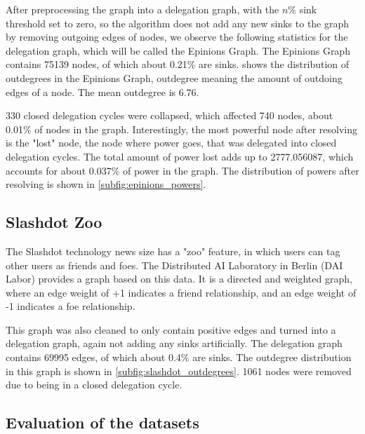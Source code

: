 After preprocessing the graph into a delegation graph, with the $n\%$ sink threshold set to zero, so the algorithm does not add any new sinks to the graph by removing outgoing edges of nodes, we observe the following statistics for the delegation graph, which will be called the Epinions Graph. The Epinions Graph contains 75139 nodes, of which about 0.21\% are sinks.  shows the distribution of outdegrees in the Epinions Graph, outdegree meaning the amount of outdoing edges of a node. The mean outdegree is 6.76.

330 closed delegation cycles were collapsed, which affected 740 nodes, about 0.01\% of nodes in the graph. Interestingly, the most powerful node after resolving is the "lost" node, the node where power goes, that was delegated into closed delegation cycles. The total amount of power lost adds up to 2777.056087, which accounts for about 0.037\% of power in the graph. The distribution of powers after resolving is shown in \cref{subfig:epinions_powers}.

\subsection{Slashdot Zoo}

The Slashdot technology news size has a "zoo" feature, in which users can tag other users as friends and foes. The Distributed AI Laboratory in Berlin (DAI Labor) provides a graph based on this data. \cite{kunegis2009a} It is a directed and weighted graph, where an edge weight of +1 indicates a friend relationship, and an edge weight of -1 indicates a foe relationship.

This graph was also cleaned to only contain positive edges and turned into a delegation graph, again not adding any sinks artificially. The delegation graph contains 69995 edges, of which about 0.4\% are sinks. The outdegree distribution in this graph is shown in \cref{subfig:slashdot_outdegrees}. 1061 nodes were removed due to being in a closed delegation cycle.
 
 \subsection{Evaluation of the datasets}
 \label{subsec:datasets_eval}
 
